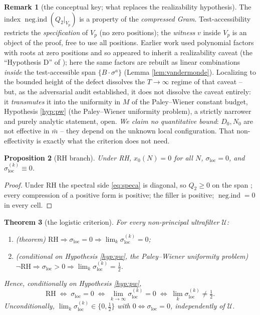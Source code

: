 \documentclass[11pt,reqno]{amsart}
\newtheorem{theorem}{Theorem}[section]
\newtheorem{proposition}[theorem]{Proposition}
\theoremstyle{definition}
\newtheorem{remark}[theorem]{Remark}
\newcommand{\negind}{\operatorname{neg.ind}}
\newcommand{\half}{\tfrac12}
\begin{document}
\begin{remark}[the conceptual key; what replaces the realizability hypothesis]
\label{rem:key}
The index \(\negind(Q_2|_{V_p})\) is a property of the \emph{compressed Gram}.
Test-accessibility restricts the \emph{specification} of \(V_p\) (no zero
positions); the \emph{witness} \(v\) inside \(V_p\) is an object of the proof,
free to use all positions. Earlier work \cite{P40} used polynomial factors with
roots at zero positions and so appeared to inherit a realizability caveat (the
``Hypothesis D'' of \cite{P40}); here the same factors are rebuilt as linear
combinations \emph{inside} the test-accessible span \(\{B\cdot\sigma^a\}\)
(Lemma \ref{lem:vandermonde}). Localizing to the bounded height of the defect
dissolves the \(T\to\infty\) regime of that caveat -- but, as the
adversarial audit established, it does not dissolve the caveat
entirely: it \emph{transmutes} it into the uniformity in \(M\) of the
Paley--Wiener constant budget, Hypothesis \ref{hyp:pw} (the Paley--Wiener uniformity problem), a
strictly narrower and purely analytic statement, open. \emph{We claim no
quantitative bound}: \(D_0,N_0\) are not effective in \(\bar m\) -- they depend
on the unknown local configuration. That non-effectivity is exactly what the
criterion does not need.
\end{remark}

\begin{proposition}[RH branch]\label{prop:RHbranch}
Under RH, \(x_0(N)=0\) for all \(N\), \(\sigma_{\mathrm{loc}}=0\), and
\(\sigma_{\mathrm{loc}}^{(k)}\equiv0\).
\end{proposition}

\begin{proof}
Under RH the spectral side \eqref{eq:speca} is diagonal, so \(Q_2\geq0\) on the
span \cite{P40,P35}; every compression of a positive form is positive; the
filler is positive; \(\negind=0\) in every cell.
\end{proof}

\begin{theorem}[the logistic criterion]\label{thm:main}
For every non-principal ultrafilter \(\mathcal U\):
\begin{enumerate}
\item[\textup{(i)}] \textup{(theorem)}
\(\mathrm{RH}\Longrightarrow\sigma_{\mathrm{loc}}=0\Longrightarrow
\lim_k\sigma_{\mathrm{loc}}^{(k)}=0\);
\item[\textup{(ii)}] \textup{(conditional on Hypothesis \ref{hyp:pw},
the Paley--Wiener uniformity problem)}
\(\neg\mathrm{RH}\Longrightarrow\sigma_{\mathrm{loc}}>0\Longrightarrow
\lim_k\sigma_{\mathrm{loc}}^{(k)}=\tfrac12\).
\end{enumerate}
Hence, \emph{conditionally on Hypothesis \ref{hyp:pw}},
\[
\mathrm{RH}\;\Longleftrightarrow\;\sigma_{\mathrm{loc}}=0\;\Longleftrightarrow\;
\lim_{k\to\infty}\sigma_{\mathrm{loc}}^{(k)}=0\;\Longleftrightarrow\;
\lim_{k}\sigma_{\mathrm{loc}}^{(k)}\neq\tfrac12 .
\]
Unconditionally, \(\lim_k\sigma_{\mathrm{loc}}^{(k)}\in\{0,\half\}\) with
\(0\iff\sigma_{\mathrm{loc}}=0\), independently of \(\mathcal U\).
\end{theorem}
\end{document}
